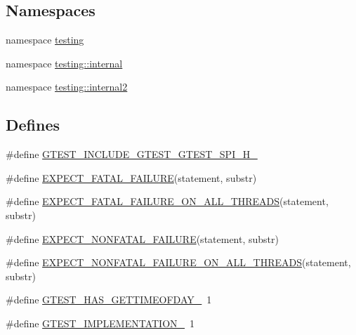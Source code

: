 \subsection*{\-Namespaces}
\begin{DoxyCompactItemize}
\item 
namespace \hyperlink{namespacetesting}{testing}
\item 
namespace \hyperlink{namespacetesting_1_1internal}{testing\-::internal}
\item 
namespace \hyperlink{namespacetesting_1_1internal2}{testing\-::internal2}
\end{DoxyCompactItemize}
\subsection*{\-Defines}
\begin{DoxyCompactItemize}
\item 
\#define \hyperlink{fused-src_2gtest_2gtest-all_8cc_a2f159eaa9c00e7aa9fd6b296e520e35c}{\-G\-T\-E\-S\-T\-\_\-\-I\-N\-C\-L\-U\-D\-E\-\_\-\-G\-T\-E\-S\-T\-\_\-\-G\-T\-E\-S\-T\-\_\-\-S\-P\-I\-\_\-\-H\-\_\-}
\item 
\#define \hyperlink{fused-src_2gtest_2gtest-all_8cc_a819a3fd7f8b8cf24b6f1b3a26708973d}{\-E\-X\-P\-E\-C\-T\-\_\-\-F\-A\-T\-A\-L\-\_\-\-F\-A\-I\-L\-U\-R\-E}(statement, substr)
\item 
\#define \hyperlink{fused-src_2gtest_2gtest-all_8cc_ad8aac5bc859b2ddc07583636ae4f45cf}{\-E\-X\-P\-E\-C\-T\-\_\-\-F\-A\-T\-A\-L\-\_\-\-F\-A\-I\-L\-U\-R\-E\-\_\-\-O\-N\-\_\-\-A\-L\-L\-\_\-\-T\-H\-R\-E\-A\-D\-S}(statement, substr)
\item 
\#define \hyperlink{fused-src_2gtest_2gtest-all_8cc_a8376fd6821bd88fd806697355e79e138}{\-E\-X\-P\-E\-C\-T\-\_\-\-N\-O\-N\-F\-A\-T\-A\-L\-\_\-\-F\-A\-I\-L\-U\-R\-E}(statement, substr)
\item 
\#define \hyperlink{fused-src_2gtest_2gtest-all_8cc_a9f4cf1f150fe9facfc4cbf0bae646ee9}{\-E\-X\-P\-E\-C\-T\-\_\-\-N\-O\-N\-F\-A\-T\-A\-L\-\_\-\-F\-A\-I\-L\-U\-R\-E\-\_\-\-O\-N\-\_\-\-A\-L\-L\-\_\-\-T\-H\-R\-E\-A\-D\-S}(statement, substr)
\item 
\#define \hyperlink{fused-src_2gtest_2gtest-all_8cc_a7c139c1711de5a69cbc934e8a082e4f9}{\-G\-T\-E\-S\-T\-\_\-\-H\-A\-S\-\_\-\-G\-E\-T\-T\-I\-M\-E\-O\-F\-D\-A\-Y\-\_\-}~1
\item 
\#define \hyperlink{fused-src_2gtest_2gtest-all_8cc_a83bd232fd1077579fada92c31bb7469f}{\-G\-T\-E\-S\-T\-\_\-\-I\-M\-P\-L\-E\-M\-E\-N\-T\-A\-T\-I\-O\-N\-\_\-}~1
\item 

\end{DoxyCompactItemize}
